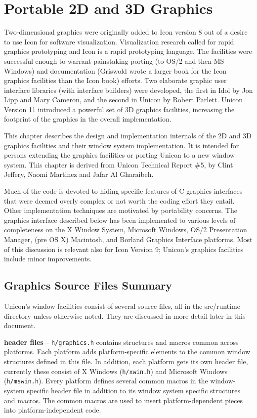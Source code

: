 \chapter{Portable 2D and 3D Graphics}

Two-dimensional graphics were originally added to Icon version 8 out
of a desire to use Icon for software visualization. Visualization
research called for rapid graphics prototyping and Icon is a rapid
prototyping language. The facilities were successful enough to warrant
painstaking porting (to OS/2 and then MS Windows) and documentation
(Griswold wrote a larger book for the Icon graphics facilities than
the Icon book) efforts.  Two elaborate graphic user interface
libraries (with interface builders) were developed, the first in Idol
by Jon Lipp and Mary Cameron, and the second in Unicon by Robert
Parlett.  Unicon Version 11 introduced a powerful set of 3D graphics
facilities, increasing the footprint of the graphics in the overall
implementation.

This chapter describes the design and implementation internals of the
2D and 3D graphics facilities and their window system
implementation. It is intended for persons extending the graphics
facilities or porting Unicon to a new window system. This chapter is
derived from Unicon Technical Report \#5, by Clint Jeffery, Naomi
Martinez and Jafar Al Gharaibeh.

Much of the code is devoted to hiding specific features of C graphics
interfaces that were deemed overly complex or not worth the coding
effort they entail. Other implementation techniques are motivated by
portability concerns. The graphics interface described below has been
implemented to various levels of completeness on the X Window System,
Microsoft Windows, OS/2 Presentation Manager, (pre OS X) Macintosh,
and Borland Graphics Interface platforms. Most of this discussion is
relevant also for Icon Version 9; Unicon's graphics facilities
include minor improvements.

\section{Graphics Source Files Summary}

Unicon's window facilities consist of several source files, all in the
src/runtime directory unless otherwise noted. They are discussed in more
detail later in this document.

\textbf{header files} -- \texttt{h/graphics.h} contains structures and
macros common across platforms. Each platform adds platform-specific
elements to the common window structures defined in this file. In
addition, each platform gets its own header file, currently these
consist of X Windows (\texttt{h/xwin.h}) and Microsoft Windows
(\texttt{h/mswin.h}). Every platform defines several common macros in
the window-system specific header file in addition to its window
system specific structures and macros. The common macros are used to
insert platform-dependent pieces into platform-independent code.

